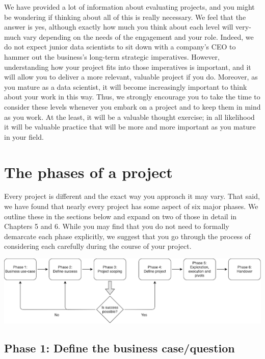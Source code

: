 \documentclass[
]{book}
\begin{document}
We have provided a lot of information about evaluating projects, and you might be wondering if thinking about all of this is really necessary. We feel that the answer is yes, although exactly how much you think about each level will very-much vary depending on the needs of the engagement and your role. Indeed, we do not expect junior data scientists to sit down with a company's CEO to hammer out the business's long-term strategic imperatives. However, understanding how your project fits into those imperatives is important, and it will allow you to deliver a more relevant, valuable project if you do. Moreover, as you mature as a data scientist, it will become increasingly important to think about your work in this way. Thus, we strongly encourage you to take the time to consider these levels whenever you embark on a project and to keep them in mind as you work. At the least, it will be a valuable thought exercise; in all likelihood it will be valuable practice that will be more and more important as you mature in your field.

\hypertarget{the-phases-of-a-project}{%
\chapter{The phases of a project}\label{the-phases-of-a-project}}

Every project is different and the exact way you approach it may vary. That said, we have found that nearly every project has some aspect of six major phases. We outline these in the sections below and expand on two of those in detail in Chapters 5 and 6. While you may find that you do not need to formally demarcate each phase explicitly, we suggest that you go through the process of considering each carefully during the course of your project.

\includegraphics[width=1\linewidth]{figures/phases-flow}

\hypertarget{phase-1-define-the-business-casequestion}{%
\section{Phase 1: Define the business case/question}\label{phase-1-define-the-business-casequestion}}
\end{document}
